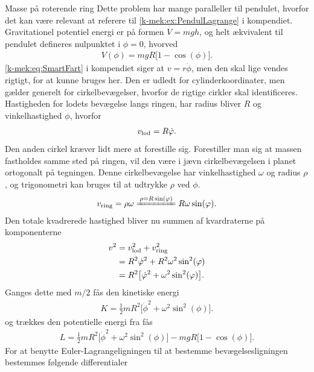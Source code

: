 \documentclass[crop=false, class=memoir]{standalone}
\begin{document}
\begin{opgave}[3]{Masse på roterende ring}
%
Dette problem har mange paralleller til pendulet, hvorfor det kan være relevant at referere til \cref{k-mek:ex:PendulLagrange} i kompendiet.
%
\opg Gravitationel potentiel energi er på formen $V=mgh$, og helt ækvivalent til pendulet defineres nulpunktet i $\phi = 0$, hvorved
%
\begin{align*}
	V(\phi) = mgR\big[1 - \cos(\phi)\big].
\end{align*}
%
\opg \cref{k-mek:eq:SmartFart} i kompendiet siger at $v = r\dot{\phi}$, men den skal lige vendes rigtigt, for at kunne bruges her. Den er udledt for cylinderkoordinater, men gælder generelt for cirkelbevægelser, hvorfor de rigtige cirkler skal identificeres. Hastigheden for lodets bevægelse langs ringen, har radius bliver $R$ og vinkelhastighed $\dot{\phi}$, hvorfor
%
\begin{align*}
	v_\textup{lod} = R\dot{\phi}.
\end{align*}
%
Den anden cirkel kræver lidt mere at forestille sig. Forestiller man sig at massen fastholdes samme sted på ringen, vil den være i jævn cirkelbevægelsen i planet ortogonalt på tegningen. Denne cirkelbevægelse har vinkelhastighed $\omega$ og radius $\rho$, og trigonometri kan bruges til at udtrykke $\rho$ ved $\phi$.
%
\begin{align*}
	v_\textup{ring} = \rho\omega \xleq{\rho = R\sin(\phi)} R\omega\sin(\phi).
\end{align*} 
%
\opg Den totale kvadrerede hastighed bliver nu summen af kvardraterne på komponenterne
%
\begin{align*}
	v^2 &= v_\textup{lod}^2 + v_\textup{ring}^2 \\
	&= R^2\dot{\phi}^2 + R^2\omega^2\sin^2(\phi) \\
	&= R^2\big[\dot{\phi}^2 + \omega^2\sin^2(\phi)\big].
\end{align*}
%
Ganges dette med $m/2$ fås den kinetiske energi
%
\begin{align*}
	K = \frac{1}{2}mR^2\big[\dot{\phi}^2 + \omega^2\sin^2(\phi)\big].
\end{align*}
%
og trækkes den potentielle energi fra fås
%
\begin{align*}
	L = \frac{1}{2}mR^2\big[\dot{\phi}^2 + \omega^2\sin^2(\phi)\big] - mgR\big[1-\cos(\phi)\big].
\end{align*}
%
\opg For at benytte Euler-Lagrangeligningen til at bestemme bevægelsesligningen bestemmes følgende differentialer
%
\begin{align*}

\end{align*}
\end{opgave}
\end{document}
